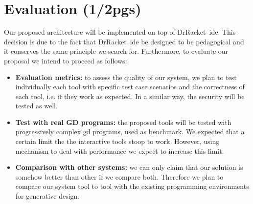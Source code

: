 
% 
% 

\section{Evaluation (1/2pgs)}
\label{sec:eval}

Our proposed architecture will be implemented on top of DrRacket~\ac{ide}. This decision is due to the fact that DrRacket~\ac{ide} be designed to be pedagogical and it conserves the same principle we search for. Furthermore, to evaluate our proposal we intend to proceed as follows:

\begin{itemize}
\item \textbf{Evaluation metrics:} to assess the quality of our system, we plan to test individually each tool with specific test case scenarios and the correctness of each tool, i.e. if they work as expected. In a similar way, the security will be tested as well.

\item \textbf{Test with real GD programs:} the proposed tools will be tested  with progressively complex \ac{gd} programs, used as benchmark. We expected that a certain limit the the interactive tools stoop to work. However, using mechanism to deal with performance we expect to increase this limit.

\item \textbf{Comparison with other systems:} we can only claim that our solution is somehow better than other if we compare both. Therefore we plan to compare our system tool to tool with the existing programming environments for generative design. 
\end{itemize}